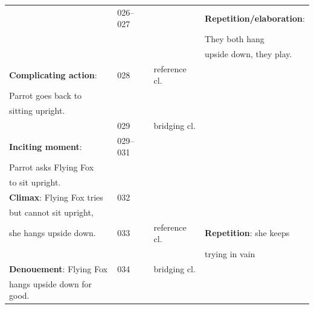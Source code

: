 \documentclass[output=paper]{LSP/langsci}
\begin{document}
\begin{table}[]
\begin{tabular}{llll}
                                           & 026--027          &                 & \textbf{Repetition/elaboration}:       \\
                                       &                   &                 & They both hang                      \\
                                           &                   &                 & upside down, they play.                      \\                                   
\textbf{Complicating action}:                & 028               &  reference cl.               &                                              \\
Parrot goes back to                  &                   &                 &                                              \\
sitting upright.                       &                   &                 &                                              \\
                                      & 029               & bridging cl. &                                              \\
\textbf{Inciting moment}:                       & 029--031          &                 &                                              \\
Parrot asks Flying Fox                   &                   &                 &                                              \\
to sit upright.                         &                   &                 &                                              \\
\textbf{Climax}: Flying Fox tries                  & 032               &                 &                                              \\
but cannot sit upright,                 &                   &                 &                                              \\
she hangs upside down.                  & 033               &   reference cl.              & \textbf{Repetition}: she keeps         \\
                                            &              &                 &  trying in vain         \\
\textbf{Denouement}: Flying Fox                   & 034               & bridging cl. &                                              \\
hangs upside down for good.                   &                   &                 &                                              \\

\end{tabular}
\end{table}
\end{document}
